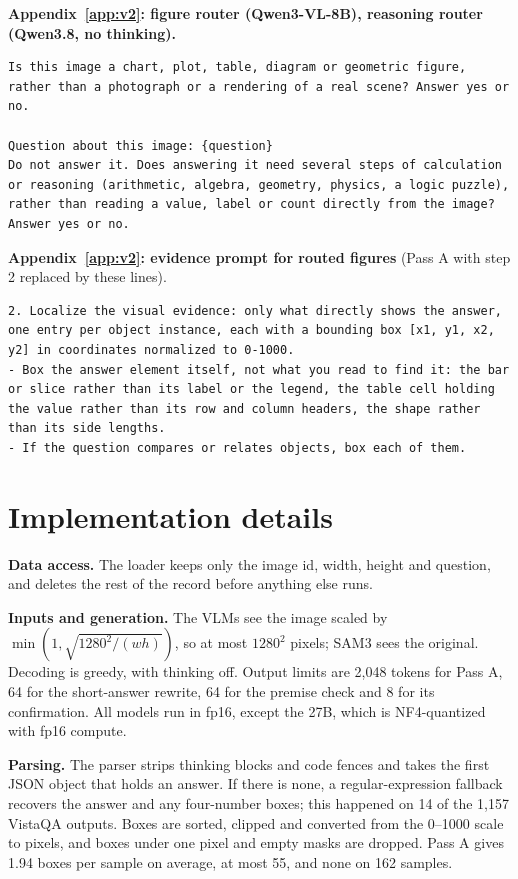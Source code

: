 \documentclass{article}
\begin{document}
\textbf{Appendix~\ref{app:v2}: figure router (Qwen3-VL-8B), reasoning router (Qwen3.8, no thinking).}
\begin{lstlisting}
Is this image a chart, plot, table, diagram or geometric figure, rather than a photograph or a rendering of a real scene? Answer yes or no.

Question about this image: {question}
Do not answer it. Does answering it need several steps of calculation or reasoning (arithmetic, algebra, geometry, physics, a logic puzzle), rather than reading a value, label or count directly from the image? Answer yes or no.
\end{lstlisting}
\textbf{Appendix~\ref{app:v2}: evidence prompt for routed figures} (Pass A with step 2 replaced by these lines).
\begin{lstlisting}
2. Localize the visual evidence: only what directly shows the answer, one entry per object instance, each with a bounding box [x1, y1, x2, y2] in coordinates normalized to 0-1000.
- Box the answer element itself, not what you read to find it: the bar or slice rather than its label or the legend, the table cell holding the value rather than its row and column headers, the shape rather than its side lengths.
- If the question compares or relates objects, box each of them.
\end{lstlisting}

\section{Implementation details}\label{app:impl}
\textbf{Data access.} The loader keeps only the image id, width, height and question, and deletes the rest of the record
before anything else runs.

\textbf{Inputs and generation.} The VLMs see the image scaled by $\min(1,\sqrt{1280^2/(wh)})$, so at most $1280^2$ pixels;
SAM3 sees the original. Decoding is greedy, with thinking off. Output limits are 2,048 tokens for Pass A, 64 for the short-answer
rewrite, 64 for the premise check and 8 for its confirmation. All models run in fp16, except the 27B, which is NF4-quantized with
fp16 compute.

\textbf{Parsing.} The parser strips thinking blocks and code fences and takes the first JSON object that holds an answer. If there
is none, a regular-expression fallback recovers the answer and any four-number boxes; this happened on 14 of the 1,157 VistaQA outputs.
Boxes are sorted, clipped and converted from the 0--1000 scale to pixels, and boxes under one pixel and empty masks are dropped. Pass A
gives 1.94 boxes per sample on average, at most 55, and none on 162 samples.
\end{document}

